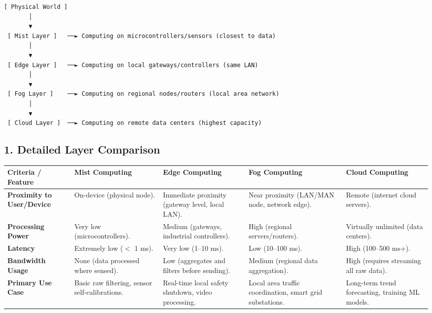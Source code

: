 \begin{lstlisting}
[ Physical World ] 
       │
       ▼
 [ Mist Layer ]   ──► Computing on microcontrollers/sensors (closest to data)
       │
       ▼
 [ Edge Layer ]   ──► Computing on local gateways/controllers (same LAN)
       │
       ▼
 [ Fog Layer ]    ──► Computing on regional nodes/routers (local area network)
       │
       ▼
 [ Cloud Layer ]  ──► Computing on remote data centers (highest capacity)
\end{lstlisting}

\subsection{1. Detailed Layer Comparison}

\begin{table}[H]
\centering
\begin{tabular}{|p{}|p{}|p{}|p{}|p{}|}
\hline
Criteria / Feature & Mist Computing & Edge Computing & Fog Computing & Cloud Computing \\
\hline
\textbf{Proximity to User/Device} & On-device (physical node). & Immediate proximity (gateway level, local LAN). & Near proximity (LAN/MAN node, network edge). & Remote (internet cloud servers). \\
\hline
\textbf{Processing Power} & Very low (microcontrollers). & Medium (gateways, industrial controllers). & High (regional servers/routers). & Virtually unlimited (data centers). \\
\hline
\textbf{Latency} & Extremely low ($<$ 1 ms). & Very low (1–10 ms). & Low (10–100 ms). & High (100–500 ms+). \\
\hline
\textbf{Bandwidth Usage} & None (data processed where sensed). & Low (aggregates and filters before sending). & Medium (regional data aggregation). & High (requires streaming all raw data). \\
\hline
\textbf{Primary Use Case} & Basic raw filtering, sensor self-calibrations. & Real-time local safety shutdown, video processing. & Local area traffic coordination, smart grid substations. & Long-term trend forecasting, training ML models. \\
\hline
\end{tabular}
\end{table}

